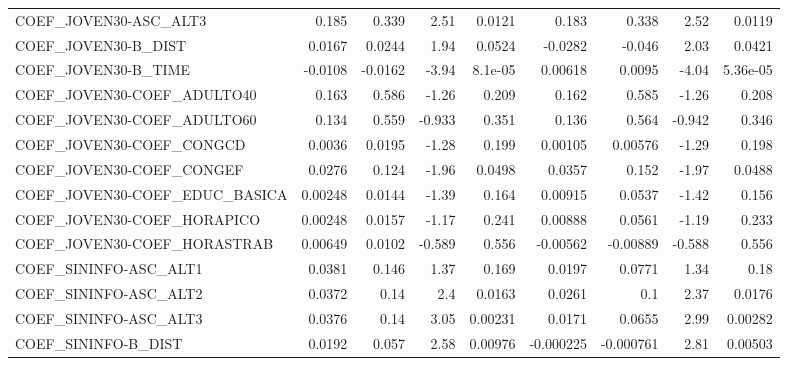 \begin{tabular}{lrrrrrrrr}
COEF\_JOVEN30-ASC\_ALT3             &       0.185 &        0.339 &     2.51 &   0.0121 &      0.183 &       0.338 &         2.52 &        0.0119 \\
COEF\_JOVEN30-B\_DIST               &      0.0167 &       0.0244 &     1.94 &   0.0524 &    -0.0282 &      -0.046 &         2.03 &        0.0421 \\
COEF\_JOVEN30-B\_TIME               &     -0.0108 &      -0.0162 &    -3.94 &  8.1e-05 &    0.00618 &      0.0095 &        -4.04 &      5.36e-05 \\
COEF\_JOVEN30-COEF\_ADULTO40        &       0.163 &        0.586 &    -1.26 &    0.209 &      0.162 &       0.585 &        -1.26 &         0.208 \\
COEF\_JOVEN30-COEF\_ADULTO60        &       0.134 &        0.559 &   -0.933 &    0.351 &      0.136 &       0.564 &       -0.942 &         0.346 \\
COEF\_JOVEN30-COEF\_CONGCD          &      0.0036 &       0.0195 &    -1.28 &    0.199 &    0.00105 &     0.00576 &        -1.29 &         0.198 \\
COEF\_JOVEN30-COEF\_CONGEF          &      0.0276 &        0.124 &    -1.96 &   0.0498 &     0.0357 &       0.152 &        -1.97 &        0.0488 \\
COEF\_JOVEN30-COEF\_EDUC\_BASICA     &     0.00248 &       0.0144 &    -1.39 &    0.164 &    0.00915 &      0.0537 &        -1.42 &         0.156 \\
COEF\_JOVEN30-COEF\_HORAPICO        &     0.00248 &       0.0157 &    -1.17 &    0.241 &    0.00888 &      0.0561 &        -1.19 &         0.233 \\
COEF\_JOVEN30-COEF\_HORASTRAB       &     0.00649 &       0.0102 &   -0.589 &    0.556 &   -0.00562 &    -0.00889 &       -0.588 &         0.556 \\
COEF\_SININFO-ASC\_ALT1             &      0.0381 &        0.146 &     1.37 &    0.169 &     0.0197 &      0.0771 &         1.34 &          0.18 \\
COEF\_SININFO-ASC\_ALT2             &      0.0372 &         0.14 &      2.4 &   0.0163 &     0.0261 &         0.1 &         2.37 &        0.0176 \\
COEF\_SININFO-ASC\_ALT3             &      0.0376 &         0.14 &     3.05 &  0.00231 &     0.0171 &      0.0655 &         2.99 &       0.00282 \\
COEF\_SININFO-B\_DIST               &      0.0192 &        0.057 &     2.58 &  0.00976 &  -0.000225 &   -0.000761 &         2.81 &       0.00503 \\

\end{tabular}
